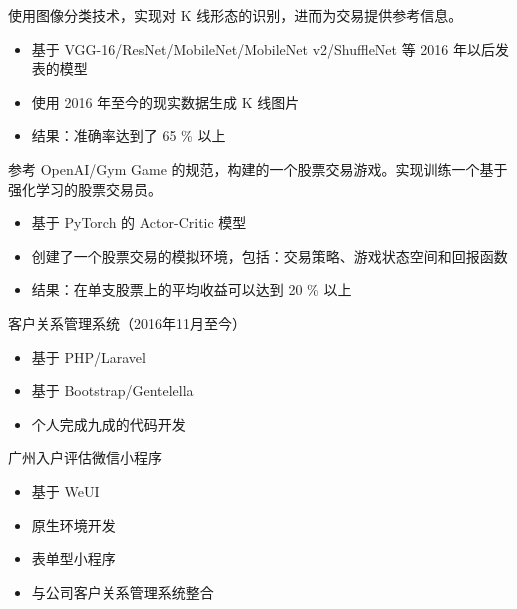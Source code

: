 \documentclass{resume}
\begin{document}
\begin{onehalfspacing}
使用图像分类技术，实现对 K 线形态的识别，进而为交易提供参考信息。
\begin{itemize}
  \item 基于 VGG-16/ResNet/MobileNet/MobileNet v2/ShuffleNet 等 2016 年以后发表的模型
  \item 使用 2016 年至今的现实数据生成 K 线图片
  \item 结果：准确率达到了 65 \% 以上
\end{itemize}
\end{onehalfspacing}

\begin{onehalfspacing}
参考 OpenAI/Gym Game 的规范，构建的一个股票交易游戏。实现训练一个基于强化学习的股票交易员。
\begin{itemize}
  \item 基于 PyTorch 的 Actor-Critic 模型
  \item 创建了一个股票交易的模拟环境，包括：交易策略、游戏状态空间和回报函数
  \item 结果：在单支股票上的平均收益可以达到 20 \% 以上
\end{itemize}
\end{onehalfspacing}

\begin{onehalfspacing}
客户关系管理系统（2016年11月至今）
\begin{itemize}
  \item 基于 PHP/Laravel
  \item 基于 Bootstrap/Gentelella
  \item 个人完成九成的代码开发
\end{itemize}
\end{onehalfspacing}
\begin{onehalfspacing}
广州入户评估微信小程序
\begin{itemize}
  \item 基于 WeUI
  \item 原生环境开发
  \item 表单型小程序
  \item 与公司客户关系管理系统整合
\end{itemize}
\end{onehalfspacing}
\end{document}
